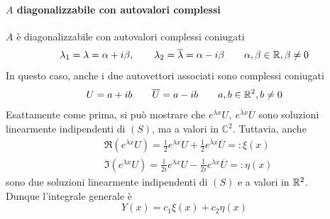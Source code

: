 \paragraph{$A$ diagonalizzabile con autovalori complessi}
$A$ è diagonalizzabile con autovalori complessi coniugati
\begin{equation*}
    \lambda_1=\lambda= \alpha+ i\beta, \qquad
    \lambda_2=\overline{\lambda}= \alpha- i\beta \qquad \alpha, \beta \in \mathbb{R}, \beta \neq0
\end{equation*}
In questo caso, anche i due autovettori associati sono complessi coniugati
\begin{equation*}
    U=a+ib \qquad \overline{U}=a-ib \qquad a, b \in \mathbb{R}^2, b \neq 0
\end{equation*}
Esattamente come prima, si può mostrare che $e^{\lambda x}U,\ e^{\overline{\lambda}x}\overline{U}$
sono soluzioni linearmente indipendenti di $(S)$, ma a valori in $\mathbb{C}^2$. Tuttavia, anche
\begin{align}
    &\Re\left(e^{\lambda x}U\right)= \frac{1}{2}e^{\lambda x}U+\frac{1}{2}e^{\overline{\lambda} x}\overline{U} =: \xi(x)\\
    &\Im\left(e^{\lambda x}U\right)= \frac{1}{2i}e^{\lambda x}U-\frac{1}{2i}e^{\overline{\lambda} x}\overline{U} =: \eta(x)
\end{align}
sono due soluzioni linearmente indipendenti di $(S)$ e a valori in $\mathbb{R}^2$.\\
Dunque l'integrale generale è
\begin{equation*}
        Y(x)= c_1 \xi(x) + c_2 \eta(x)
\end{equation*}
